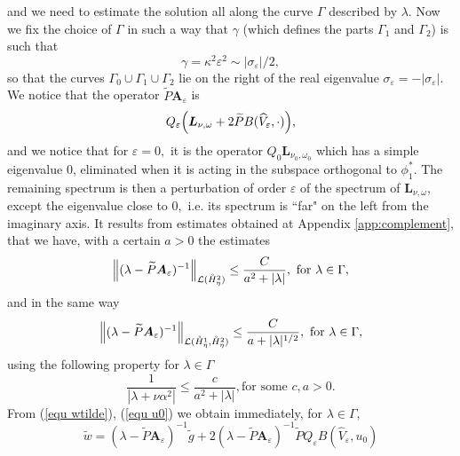 \documentclass[11pt]{article}
\begin{document}
and we need to estimate the solution all along the curve $\Gamma $ described
by $\lambda .$ Now we fix the choice of $\Gamma $ in such a way that $\gamma 
$ (which defines the parts $\Gamma _{1}$ and $\Gamma _{2}$) is such that%
\begin{equation*}
\gamma =\kappa ^{2}\varepsilon ^{2}\sim |\sigma _{\varepsilon }|/2,
\end{equation*}%
so that the curves $\Gamma _{0}\cup \Gamma _{1}\cup \Gamma _{2}$ lie on the
right of the real eigenvalue $\sigma _{\varepsilon }=-|\sigma _{\varepsilon
}|.$ We notice that the operator $\widetilde{P}\boldsymbol{A}_{\varepsilon }$
is%
\begin{equation*}
Q_{\varepsilon } \Bigl(\boldsymbol{L}_{\nu ,\omega }+2\widetilde{P}B(\widehat{V}%
_{\varepsilon },\cdot ) \Bigr),
\end{equation*}%
and we notice that for $\varepsilon =0,$ it is the operator $Q_{0}%
\boldsymbol{L}_{\nu _{0},\omega _{0}}$ which has a simple eigenvalue $0$,
eliminated when it is acting in the subspace orthogonal to $\phi _{1}^{\ast
}.$ The remaining spectrum is then a perturbation of order $\varepsilon $ of
the spectrum of $\boldsymbol{L}_{\nu ,\omega }$, except the eigenvalue close
to $0,$ i.e. its spectrum is ``far" on the left from the imaginary axis. It
results from estimates obtained at Appendix \ref{app:complement}, that we have, with a certain $a>0$ the estimates%
\begin{equation*}
\Bigl\|(\lambda -\widetilde{P}\boldsymbol{A}_{\varepsilon })^{-1} \Bigr\|_{\mathcal{L}(%
\mathring{H}_{\eta}^{2})}\leq \frac{C}{a^{2}+|\lambda |},\text{ for }\lambda
\in \Gamma ,
\end{equation*}%
and in the same way 
\begin{equation}
\Bigl\|(\lambda -\widetilde{P}\boldsymbol{A}_{\varepsilon })^{-1} \Bigr\|_{\mathcal{L}(%
\mathring{H}_{\eta}^{1},\mathring{H}_{\eta}^{2})}\leq \frac{C}{a+|\lambda |^{1/2}},%
\text{ for }\lambda \in \Gamma ,  \label{estim  resol Aeps Ptilde}
\end{equation}%
using the following property for $\lambda \in \Gamma $%
\begin{equation*}
\frac{1}{|\lambda +\nu \alpha ^{2}|}\leq \frac{c}{a^{2}+|\lambda |},\text{
for some }c,a>0.
\end{equation*}%
From (\ref{equ wtilde}), (\ref{equ u0}) we obtain immediately, for $\lambda
\in \Gamma ,$%
\begin{equation*}
\widetilde{w}=(\lambda -\widetilde{P}\boldsymbol{A}_{\varepsilon })^{-1}%
\widetilde{g}+2(\lambda -\widetilde{P}\boldsymbol{A}_{\varepsilon })^{-1}%
\widetilde{P}Q_{\varepsilon }B(\widehat{V}_{\varepsilon },u_{0})
\end{equation*}%
\end{document}

